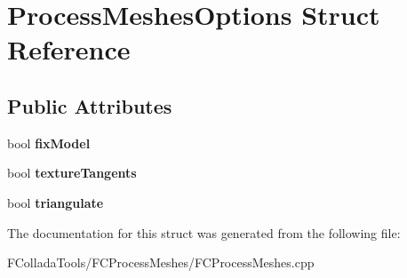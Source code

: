 \hypertarget{structProcessMeshesOptions}{
\section{ProcessMeshesOptions Struct Reference}
\label{structProcessMeshesOptions}
}
\subsection*{Public Attributes}
\begin{DoxyCompactItemize}
\item 
\hypertarget{structProcessMeshesOptions_a000c4bf327570662e861ab5fe43d81f4}{
bool {\bfseries fixModel}}
\label{structProcessMeshesOptions_a000c4bf327570662e861ab5fe43d81f4}

\item 
\hypertarget{structProcessMeshesOptions_a1236a6de5275b3f7ee9df6a9ebbcc7cb}{
bool {\bfseries textureTangents}}
\label{structProcessMeshesOptions_a1236a6de5275b3f7ee9df6a9ebbcc7cb}

\item 
\hypertarget{structProcessMeshesOptions_a227377e2f85842bb9ee5596b292360ca}{
bool {\bfseries triangulate}}
\label{structProcessMeshesOptions_a227377e2f85842bb9ee5596b292360ca}

\end{DoxyCompactItemize}


The documentation for this struct was generated from the following file:\begin{DoxyCompactItemize}
\item 
FColladaTools/FCProcessMeshes/FCProcessMeshes.cpp\end{DoxyCompactItemize}
